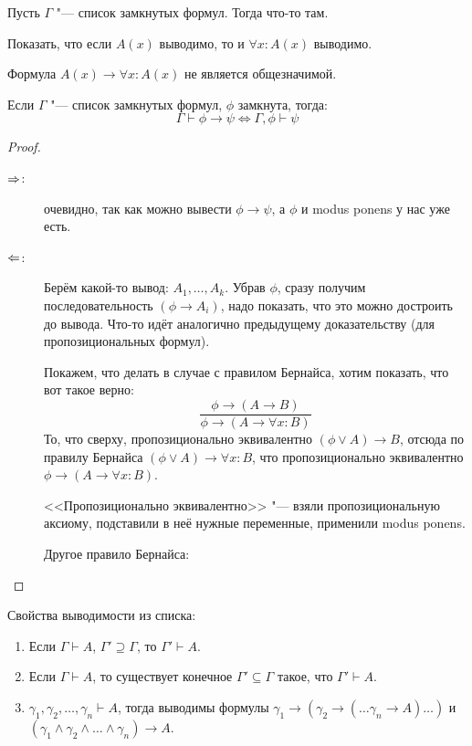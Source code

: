 \begin{theorem}
	Пусть $\Gamma$ "--- список замкнутых формул.
	Тогда что-то там. \TODO
\end{theorem}
\begin{Exercise}
	Показать, что если $A(x)$ выводимо, то и $\forall x \colon A(x)$ выводимо.
\end{Exercise}
\begin{Rem}
	Формула $A(x) \to \forall x \colon A(x)$ не является общезначимой.
\end{Rem}

\begin{lemma}[о дедукции]
	Если $\Gamma$ "--- список замкнутых формул, $\phi$ замкнута, тогда:
	\[ \Gamma \vdash \phi \to \psi \iff \Gamma, \phi \vdash \psi \]
\end{lemma}
\begin{proof}
	\begin{description}
	\item[$\Rightarrow$:]
		очевидно, так как можно вывести $\phi \to \psi$, а $\phi$ и modus ponens у нас уже  есть.
	\item[$\Leftarrow$:]
		Берём какой-то вывод: $A_1, \dots, A_k$.
		Убрав $\phi$, сразу получим последовательность $(\phi \to A_i)$, надо показать, что
		это можно достроить до вывода.
		Что-то идёт аналогично предыдущему доказательству (для пропозициональных формул).
		
		Покажем, что делать в случае с правилом Бернайса, хотим показать, что вот такое верно:
		\[ \frac{\phi \to (A \to B)}{\phi \to (A \to \forall x \colon B)} \]
		То, что сверху, пропозиционально эквивалентно $(\phi \lor A) \to B$, отсюда
		по правилу Бернайса $(\phi \lor A) \to \forall x \colon B$,
		что пропозиционально эквивалентно $\phi \to (A \to \forall x \colon B)$.
		\begin{Rem}
			<<Пропозиционально эквивалентно>> "--- взяли пропозициональную аксиому,
			подставили в неё нужные переменные, применили modus ponens.
		\end{Rem}

		Другое правило Бернайса: \TODO
	\end{description}
\end{proof}

Свойства выводимости из списка:
\begin{enumerate}
	\item Если $\Gamma \vdash A$, $\Gamma' \supseteq \Gamma$, то $\Gamma' \vdash A$.
	\item Если $\Gamma \vdash A$, то существует конечное $\Gamma' \subseteq \Gamma$ такое, что $\Gamma' \vdash A$.
	\item $\gamma_1, \gamma_2, \dots, \gamma_n \vdash A$, тогда выводимы формулы
		$\gamma_1 \to (\gamma_2 \to (\dots \gamma_n \to A)\dots)$
		и
		$(\gamma_1 \land \gamma_2 \land \dots \land \gamma_n) \to A$.
\end{enumerate}

